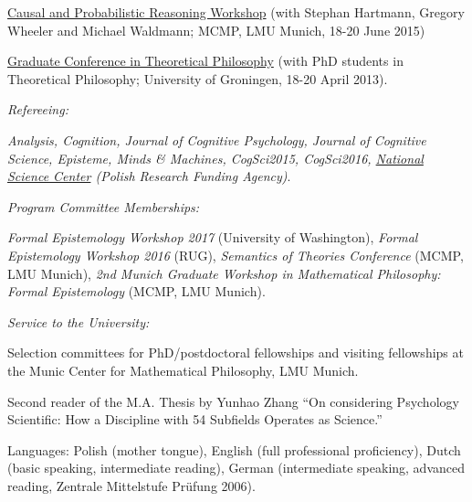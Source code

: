 \documentclass[11pt,article,oneside]{memoir}
\begin{document}
\begin{itemize}
\begin{itemize}
	\ind \href{http://lmu.de/cpr2015}{Causal and Probabilistic Reasoning Workshop} (with Stephan Hartmann, Gregory Wheeler and Michael Waldmann; MCMP, LMU Munich, 18-20 June 2015)

	\ind \href{http://www.philos.rug.nl/GCTP2013/}{Graduate Conference in Theoretical Philosophy} (with PhD students in Theoretical Philosophy; University of Groningen, 18-20 April 2013).

		\bigskip
\ind \emph{Refereeing:}
		
	\medskip
		\ind \emph{\emph{Analysis}, \emph{Cognition}, \emph{Journal of Cognitive Psychology}, \emph{Journal of Cognitive Science}, \emph{Episteme}, \emph{Minds \& Machines}, \emph{CogSci2015}, \emph{CogSci2016}, \href{https://www.ncn.gov.pl/}{National Science Center} (Polish Research Funding Agency)}.

		\bigskip
\ind \emph{Program Committee Memberships:}
		
		\medskip
		\ind \emph{Formal Epistemology Workshop 2017} (University of Washington), \emph{Formal Epistemology Workshop 2016} (RUG), \emph{Semantics of Theories Conference} (MCMP, LMU Munich), \emph{2nd Munich Graduate Workshop in Mathematical Philosophy: Formal Epistemology} (MCMP, LMU Munich).

    \bigskip
\ind \emph{Service to the University:}

		\medskip
		\ind Selection committees for PhD/postdoctoral fellowships and visiting fellowships at the Munic Center for Mathematical Philosophy, LMU Munich.

		\ind Second reader of the M.A. Thesis by Yunhao Zhang ``On considering Psychology Scientific: How a Discipline with 54 Subfields Operates as Science.''

\bigskip

\medskip

\ind Languages: Polish (mother tongue), English (full professional proficiency), Dutch
    (basic speaking, intermediate reading), German (intermediate speaking, advanced reading, Zentrale
    Mittelstufe Pr\"ufung 2006). 


\end{itemize}
\end{itemize}
\end{document}
